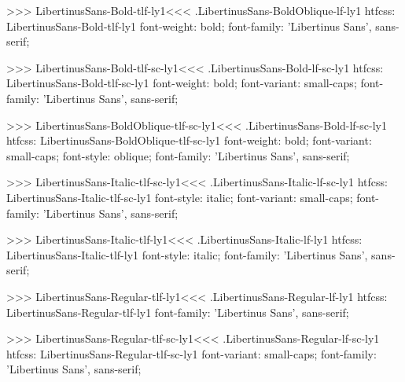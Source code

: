 >>>
\<LibertinusSans-Bold-tlf-ly1\><<<
.LibertinusSans-BoldOblique-lf-ly1
htfcss:  LibertinusSans-Bold-tlf-ly1  font-weight: bold; font-family: 'Libertinus Sans', sans-serif;

>>>
\<LibertinusSans-Bold-tlf-sc-ly1\><<<
.LibertinusSans-Bold-lf-sc-ly1
htfcss:  LibertinusSans-Bold-tlf-sc-ly1  font-weight: bold; font-variant: small-caps; font-family: 'Libertinus Sans', sans-serif;

>>>
\<LibertinusSans-BoldOblique-tlf-sc-ly1\><<<
.LibertinusSans-Bold-lf-sc-ly1
htfcss:  LibertinusSans-BoldOblique-tlf-sc-ly1  font-weight: bold; font-variant: small-caps; font-style: oblique; font-family: 'Libertinus Sans', sans-serif;

>>>
\<LibertinusSans-Italic-tlf-sc-ly1\><<<
.LibertinusSans-Italic-lf-sc-ly1
htfcss:  LibertinusSans-Italic-tlf-sc-ly1  font-style: italic; font-variant: small-caps; font-family: 'Libertinus Sans', sans-serif;

>>>
\<LibertinusSans-Italic-tlf-ly1\><<<
.LibertinusSans-Italic-lf-ly1
htfcss:  LibertinusSans-Italic-tlf-ly1  font-style: italic; font-family: 'Libertinus Sans', sans-serif;

>>>
\<LibertinusSans-Regular-tlf-ly1\><<<
.LibertinusSans-Regular-lf-ly1
htfcss:  LibertinusSans-Regular-tlf-ly1  font-family: 'Libertinus Sans', sans-serif;

>>>
\<LibertinusSans-Regular-tlf-sc-ly1\><<<
.LibertinusSans-Regular-lf-sc-ly1
htfcss:  LibertinusSans-Regular-tlf-sc-ly1  font-variant: small-caps; font-family: 'Libertinus Sans', sans-serif;

